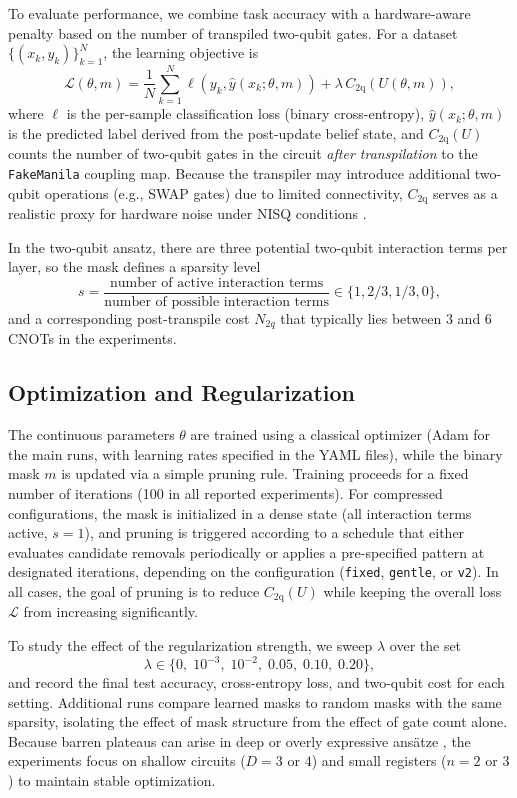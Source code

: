 \documentclass[conference]{IEEEtran}
\begin{document}
To evaluate performance, we combine task accuracy with a hardware-aware penalty based on the number of transpiled two-qubit gates. For a dataset $\{(x_k,y_k)\}_{k=1}^N$, the learning objective is
\begin{equation}
\mathcal{L}(\theta,m)
= \frac{1}{N}\sum_{k=1}^N \ell\!\left(y_k, \hat{y}(x_k;\theta,m)\right)
+ \lambda\, C_{\mathrm{2q}}\!\left(U(\theta,m)\right),
\end{equation}
where $\ell$ is the per-sample classification loss (binary cross-entropy), $\hat{y}(x_k;\theta,m)$ is the predicted label derived from the post-update belief state, and $C_{\mathrm{2q}}(U)$ counts the number of two-qubit gates in the circuit \emph{after transpilation} to the \texttt{FakeManila} coupling map. Because the transpiler may introduce additional two-qubit operations (e.g., SWAP gates) due to limited connectivity, $C_{\mathrm{2q}}$ serves as a realistic proxy for hardware noise under NISQ conditions \cite{b7,b10}. 

In the two-qubit ansatz, there are three potential two-qubit interaction terms per layer, so the mask defines a sparsity level
\[
s = \frac{\text{number of active interaction terms}}{\text{number of possible interaction terms}} \in \{1, 2/3, 1/3, 0\},
\]
and a corresponding post-transpile cost $N_{2q}$ that typically lies between $3$ and $6$ CNOTs in the experiments.

\subsection{Optimization and Regularization}

The continuous parameters $\theta$ are trained using a classical optimizer (Adam for the main runs, with learning rates specified in the YAML files), while the binary mask $m$ is updated via a simple pruning rule. Training proceeds for a fixed number of iterations (100 in all reported experiments). For compressed configurations, the mask is initialized in a dense state (all interaction terms active, $s=1$), and pruning is triggered according to a schedule that either evaluates candidate removals periodically or applies a pre-specified pattern at designated iterations, depending on the configuration (\texttt{fixed}, \texttt{gentle}, or \texttt{v2}). In all cases, the goal of pruning is to reduce $C_{\mathrm{2q}}(U)$ while keeping the overall loss $\mathcal{L}$ from increasing significantly.

To study the effect of the regularization strength, we sweep $\lambda$ over the set
\[
\lambda \in \{0,\;10^{-3},\;10^{-2},\;0.05,\;0.10,\;0.20\},
\]
and record the final test accuracy, cross-entropy loss, and two-qubit cost for each setting. Additional runs compare learned masks to random masks with the same sparsity, isolating the effect of mask structure from the effect of gate count alone. Because barren plateaus can arise in deep or overly expressive ansätze \cite{b18}, the experiments focus on shallow circuits ($D=3$ or $4$) and small registers ($n=2$ or $3$) to maintain stable optimization.
\end{document}
